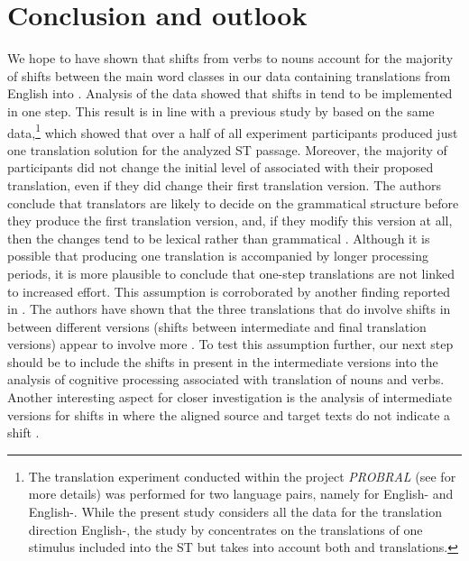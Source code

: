 \documentclass[output=paper]{LSP/langsci}
\begin{document}
\section{Conclusion and outlook}\label{serbinaetal:sec:6} 
We hope to have shown that shifts from verbs to nouns account for the majority of shifts between the main word classes in our data containing translations from English into . Analysis of the  data showed that shifts in  tend to be implemented in one step. This result is in line with a previous study by \citet{Alves.2014} based on the same data,\footnote{The translation experiment conducted within the project \textit{PROBRAL} (see  for more details) was performed for two language pairs, namely for English- and English-. While the present study considers all the data for the translation direction English-, the study by \citet{Alves.2014} concentrates on the translations of one stimulus included into the ST but takes into account both  and  translations.}  which showed that over a half of all experiment participants produced just one translation solution for the analyzed ST passage. Moreover, the majority of participants did not change the initial level of  associated with their proposed translation, even if they did change their first translation version. The authors conclude that translators are likely to decide on the grammatical structure before they produce the first translation version, and, if they modify this version at all, then the changes tend to be lexical rather than grammatical \citet[39]{Alves.2014} . Although it is possible that producing one translation is accompanied by longer processing periods, it is more plausible to conclude that one-step translations are not linked to increased effort. This assumption is corroborated by another finding reported in \citet{Alves.2014}. The authors have shown that the three translations that do involve shifts in  between different versions (shifts between intermediate and final translation versions) appear to involve more  \citet[40]{Alves.2014} . To test this assumption further, our next step should be to include the shifts in  present in the intermediate versions into the analysis of cognitive processing associated with translation of nouns and verbs. Another interesting aspect for closer investigation is the analysis of intermediate versions for shifts in  where the aligned source and target texts do not indicate a shift \citep{Niemietz2014}.
\end{document}
